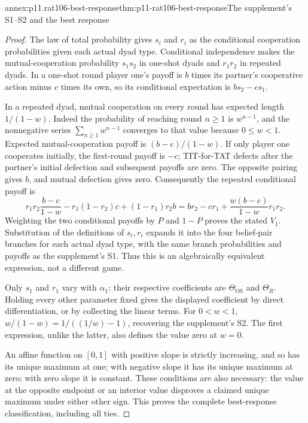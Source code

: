 \begin{annexitem}{annex:p11.rat106-best-response}{thm:p11-rat106-best-response}{The supplement's S1--S2 and the best response}
\begin{proof}
The law of total probability gives \(s_i\) and \(r_i\)
as the conditional cooperation probabilities given each actual dyad
type. Conditional independence makes the mutual-cooperation
probability \(s_1s_2\) in one-shot dyads and \(r_1r_2\)
in repeated dyads. In a one-shot round player one's payoff is
\(b\) times its partner's cooperative action minus \(c\)
times its own, so its conditional expectation is \(bs_2-cs_1\).

In a repeated dyad, mutual cooperation on every round has expected
length \(1/(1-w)\). Indeed the probability of reaching round
\(n\geq1\) is \(w^{n-1}\), and the nonnegative series
\(\sum_{n\geq1}w^{n-1}\) converges to that value because
\(0\leq w<1\). Expected mutual-cooperation payoff is
\((b-c)/(1-w)\). If only player one cooperates initially,
the first-round payoff is \(-c\); TIT-for-TAT defects after
the partner's initial defection and subsequent payoffs are zero.
The opposite pairing gives \(b\), and mutual defection gives
zero. Consequently the repeated conditional payoff is
\[
 r_1r_2\frac{b-c}{1-w}-r_1(1-r_2)c+(1-r_1)r_2b
 =br_2-cr_1+\frac{w(b-c)}{1-w}r_1r_2.
\]
Weighting the two conditional payoffs by \(P\) and \(1-P\)
proves the stated \(V_1\). Substitution of the definitions
of \(s_i,r_i\) expands it into the four belief-pair branches
for each actual dyad type, with the same branch probabilities
and payoffs as the supplement's S1. Thus this is an algebraically
equivalent expression, not a different game.

Only \(s_1\) and \(r_1\) vary with \(\alpha_1\):
their respective coefficients are \(\Theta_{\mathrm{OS}}\)
and \(\Theta_R\). Holding every other parameter fixed gives
the displayed coefficient by direct differentiation, or by
collecting the linear terms. For \(0<w<1\),
\(w/(1-w)=1/((1/w)-1)\), recovering the supplement's S2.
The first expression, unlike the latter, also defines the value
zero at \(w=0\).

An affine function on \([0,1]\) with positive slope is strictly
increasing, and so has its unique maximum at one; with negative
slope it has its unique maximum at zero; with zero slope it is
constant. These conditions are also necessary: the value at the
opposite endpoint or an interior value disproves a claimed unique
maximum under either other sign. This proves the complete
best-response classification, including all ties.


\end{proof}
\end{annexitem}
